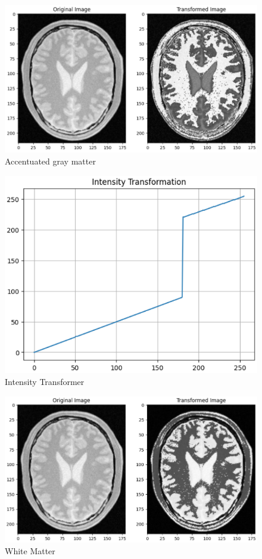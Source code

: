 \documentclass[11pt,a4paper]{article}
\begin{document}
{\begin{figure}[h]
    \centering
    \includegraphics[width=0.9\linewidth]{images/gray_matter.png}
    \caption{Accentuated gray matter}
\end{figure}}

{\begin{figure}[h]
    \centering
    \includegraphics[width=0.8\linewidth]{images/intensity_transformer3.png}
    \caption{Intensity Transformer}
\end{figure}}

\newpage

\begin{figure}[h]
    \centering
    \includegraphics[width=0.9\linewidth]{images/white_matter.png}
    \caption{White Matter}
\end{figure}
\end{document}
